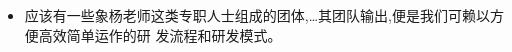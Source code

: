 \documentclass[11pt]{article}
\begin{document}
\begin{comment}

  制度的确起到一定的约束作用。但我在中兴从来不强调这个看法,而且反对它。如果我们把制度看成约束个体行为
  的,团队的效率只能发展到一个地步,就不可以再发展了。就好像我们中兴现在一样。我们在自己文化底下,已经发展
  到最成熟的可能层次了。如果要再提高,就好像你说的一样,需要有突破。这个突破之一,就是不再用约束行为作为制
  度的主要作用!那么,制度是怎么呢?

  我们应该看得到,制度是保证效率的。

  拿交通规矩来讲。红灯停车是一个限制。后果是罚款。在中国,把这个看成一个限制的人均比例很高,所以我们有抵触
  情绪,有很多冲红灯的事故。在国外,红灯也要停车。但是冲红灯的人很少。甚至在深夜里,四野无人、无车、无警察,红
  灯时,车还是停在那里。为什么?是怕被罚款么?不是!他们有能力支付罚款。 其中的道理,是因为他们已经不把红灯
  停车当成一个对他们的限制。他们了解到,这是对社会效率的一个保证。 他是社会的一分子,所以他知道要保持自己
  的利益、价值,就要遵守这个``约束''。

  在中国,红灯是一个约束,后果也是罚款。所以我出得起罚款的,我就冲红灯!甚至有人先把钱拿出来,然后去冲那个
  红灯。这是一个低效的制度。中国有世界上1。9\%的车,却有15\%的死亡事故。我们大概每一万辆车之中,每年有9个死
  亡；欧美是不到3个!

  这个看法,把制度看成``约束'',跟我们的考核很相像。考核已经不是一个真正的激励,而是一个行为的``约束''。
  所以我也反对中兴现在的考核。因为它贬低了人的品格和价值。这样会防碍我们的发展,因为这样不能真正地激励员
  工的热情!

\end{comment}

\begin{myquote}

  \begin{itemize}
  \item 应该有一些象杨老师这类专职人士组成的团体,\ldots 其团队输出,便是我们可赖以方便高效简单运作的研
    发流程和研发模式。
\end{itemize}
\end{myquote}

\begin{comment}

  还是要等!这是守株待兔!不要这样恭维我。我承担不起。我更希望你看得到我要说的话!

  你的期待,是很难很难会发生的。其实团队是有的。公司也请过不知多少老外、本土专家!我也还在这里。我提供培训、
  咨询,到底又有几多内容是被接受的呢?使用的呢?同志们也总觉得要等领导改变。领导们更自以为自己是对的,问题
  都是在基层员工!没完没了!如此,就蹉跎了快六年了。

  不要再等了,出路只有是自己行动起来!

  不要以为我偏护领导。我这句话,是对所有人说的,包括领导。领导也要改进。但是我感觉到,很多员工对这个想法就
  害怕。领导在他们心中是神。要不然大家就进步的更快了。员工自己也需要改变这一点。

  归根结底,出路还是在改变自己(能力、思维、品格),提高自己。
\end{comment}
\end{document}
